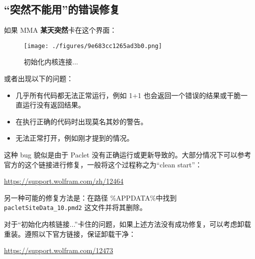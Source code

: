 \subsection{“突然不能用”的错误修复}
如果 MMA \textbf{某天突然}卡在这个界面：
\begin{figure}[ht]
\centering
\texttt{[image: ./figures/9e683cc1265ad3b0.png]}
\caption{初始化内核连接...} \label{fig_Mma_2}
\end{figure}
或者出现以下的问题：

\begin{itemize}
\item 几乎所有代码都无法正常运行，例如 1+1 也会返回一个错误的结果或干脆一直运行没有返回结果。
\item 在执行正确的代码时出现莫名其妙的警告。
\item 无法正常打开，例如刚才提到的情况。
\end{itemize}

这种 bug 貌似是由于 Paclet 没有正确运行或更新导致的。大部分情况下可以参考官方的这个链接进行修复，一般将这个过程称之为“clean start”：

\href{https://support.wolfram.com/zh/12464}{https://support.wolfram.com/zh/12464}


另一种可能的修复方法是：在路径 \%APPDATA\%\Mathematica\Paclets\Configuration 中找到 \verb`pacletSiteData_10.pmd2` 这文件并将其删除。

对于“初始化内核链接...”卡住的问题，如果上述方法没有成功修复，可以考虑卸载重装。遵照以下官方链接，保证卸载干净：

\href{https://support.wolfram.com/12473}{https://support.wolfram.com/12473}